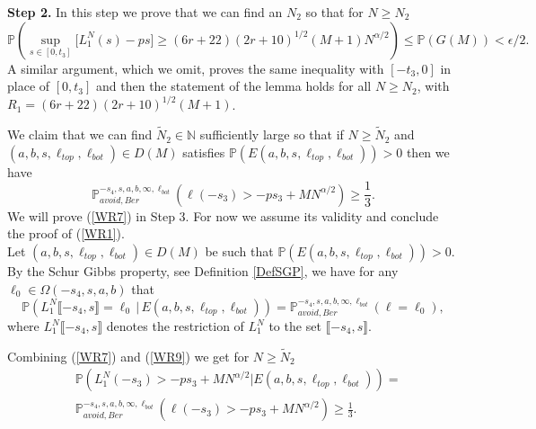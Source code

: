{\raggedleft \bf Step 2.} In this step we prove that  we can find an $N_2$ so that for $N \geq N_2$
\begin{equation}\label{WR1}
\mathbb{P}\left( \sup_{s \in [0,t_3] }\big[ L^N_1(s) - p s \big] \geq  (6r+22)(2r+10)^{1/2}(M+1)N^{\alpha/2} \right) \leq \mathbb{P}(G(M)) < \epsilon/2.
\end{equation}
A similar argument, which we omit, proves the same inequality with $[-t_3,0]$ in place of $[0,t_3]$ and then the statement of the lemma holds for all $N\geq N_2$, with $R_1 = (6r+22)(2r+10)^{1/2}(M+1)$.

We claim that we can find $\tilde{N}_2 \in \mathbb{N}$ sufficiently large so that if $N \geq \tilde{N}_2$ and $(a,b,s,\ell_{top},\ell_{bot})\in D(M)$ satisfies $\mathbb{P}( E(a,b,s,\ell_{top},\ell_{bot})) > 0$ then we have
\begin{equation}\label{WR7}
\mathbb{P}^{-s_4,s,a,b,\infty,\ell_{bot}}_{avoid, Ber}\left(\ell(-s_3) > -ps_3 + MN^{\alpha/2}\right) \geq \frac{1}{3}.
\end{equation}
We will prove (\ref{WR7}) in Step 3. For now we assume its validity and conclude the proof of (\ref{WR1}).\\

Let $(a,b,s,\ell_{top},\ell_{bot})\in D(M)$ be such that $\mathbb{P}( E(a,b,s,\ell_{top},\ell_{bot})) > 0$. By the Schur Gibbs property, see Definition \ref{DefSGP}, we have for any $\ell_0\in\Omega(-s_4,s,a,b)$ that
\begin{equation}\label{WR9}
\mathbb{P}\left(L_1^N\llbracket -s_4,s \rrbracket = \ell_0\,|\,E(a,b,s,\ell_{top}, \ell_{bot}) \right) = \mathbb{P}^{-s_4,s,a,b,\infty,\ell_{bot}}_{avoid, Ber}(\ell = \ell_0),
\end{equation}
where $L_1^N\llbracket -s_4,s \rrbracket$ denotes the restriction of $L_1^N$ to the set $\llbracket -s_4,s \rrbracket$.

Combining (\ref{WR7}) and (\ref{WR9}) we get for $N \geq \tilde{N}_2$
\begin{equation}\label{WR10}
\begin{split}
&\mathbb{P}\left( L_1^N(-s_3) > -ps_3 + MN^{\alpha/2} \vert E(a,b,s, \ell_{top}, \ell_{bot})\right) = \\
&\mathbb{P}^{-s_4,s,a,b,\infty,\ell_{bot}}_{avoid, Ber}\left(\ell(-s_3) > -ps_3 + MN^{\alpha/2}\right) \geq \frac{1}{3}.
\end{split}
\end{equation}

